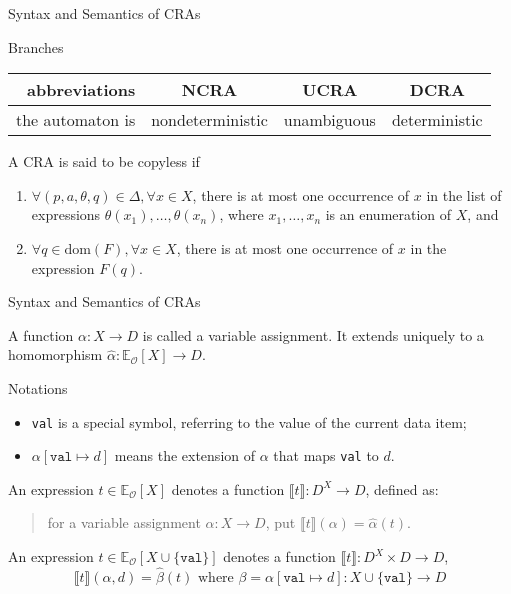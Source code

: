 \documentclass[landscape]{beamer}
\newcommand{\calO}{\mathcal{O}}
\newcommand{\bbE}{\mathbb{E}}
\newcommand{\ttVal}{\mathtt{val}}
\newcommand{\sem}[1]{\llbracket {#1} \rrbracket}
\newcommand{\dom}{\mathrm{dom}}
\begin{document}
\begin{frame}{Syntax and Semantics of CRAs}
    \begin{block}{Branches}
    \centering
    \begin{tabular}{r|ccc}
        abbreviations & NCRA & UCRA & DCRA \\\hline
        the automaton is & nondeterministic & unambiguous & deterministic
    \end{tabular}
    \end{block}
    \pause
    
    \begin{definition}
    A CRA is said to be \alert{copyless} if
    \begin{enumerate}
        \item $\forall (p,a,\theta,q) \in \Delta, \forall x \in X$,
            there is at most one occurrence of $x$ in the list of expressions
            $\theta(x_1),\dots,\theta(x_n)$,
            where $x_1,\dots,x_n$ is an enumeration of $X$, and
        \item $\forall q \in \dom(F), \forall x \in X$,
            there is at most one occurrence of $x$ in the expression $F(q)$.
    \end{enumerate}
    \end{definition}
\end{frame}

\begin{frame}{Syntax and Semantics of CRAs}
    \begin{definition}
    A function $\alpha: X \to D$ is called a \alert{variable assignment}.
    It extends uniquely to a homomorphism $\hat{\alpha}: \bbE_\calO[X] \to D$.
    \end{definition}
    \pause
    
    \begin{block}{Notations}
    \begin{itemize}
        \item \texttt{val} is a special symbol,
            referring to the value of the current data item;
        \item $\alpha[\ttVal \mapsto d]$ means the extension of $\alpha$
            that maps \texttt{val} to $d$.
    \end{itemize}
    \end{block}
    \pause

    \begin{definition}
    An expression $t \in \bbE_\calO[X]$ denotes a function $\sem{t}: D^X \to D$,
    defined as:
    \begin{quote}
        for a variable assignment $\alpha: X \to D$,
        put $\sem{t}(\alpha) = \hat{\alpha}(t)$.
    \end{quote}
    \pause
    
    An expression $t \in \bbE_\calO[X \cup \{\ttVal\}]$
        denotes a function $\sem{t}: D^X \times D \to D$,
    \[
        \sem{t}(\alpha, d) = \hat{\beta}(t) \text{ where }
            \beta = \alpha[\ttVal \mapsto d]:
            X \cup \{ \ttVal \} \to D
    \]
    \end{definition}
\end{frame}
\end{document}
